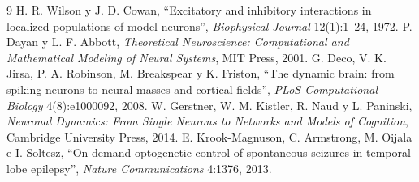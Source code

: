 \documentclass[11pt,a4paper]{article}
\begin{document}
\begin{thebibliography}{9}
 H. R. Wilson y J. D. Cowan, ``Excitatory and inhibitory interactions in localized populations of model neurons'', \emph{Biophysical Journal} 12(1):1--24, 1972.
 P. Dayan y L. F. Abbott, \emph{Theoretical Neuroscience: Computational and Mathematical Modeling of Neural Systems}, MIT Press, 2001.
 G. Deco, V. K. Jirsa, P. A. Robinson, M. Breakspear y K. Friston, ``The dynamic brain: from spiking neurons to neural masses and cortical fields'', \emph{PLoS Computational Biology} 4(8):e1000092, 2008.
 W. Gerstner, W. M. Kistler, R. Naud y L. Paninski, \emph{Neuronal Dynamics: From Single Neurons to Networks and Models of Cognition}, Cambridge University Press, 2014.
 E. Krook-Magnuson, C. Armstrong, M. Oijala e I. Soltesz, ``On-demand optogenetic control of spontaneous seizures in temporal lobe epilepsy'', \emph{Nature Communications} 4:1376, 2013.
\end{thebibliography}
\end{document}
